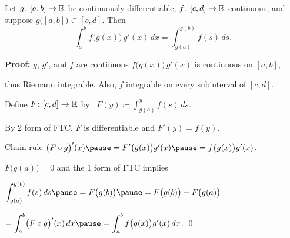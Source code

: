 \documentclass[10pt,aspectratio=149]{beamer}
\begin{document}
\begin{frame}

\begin{theorem}
Let $g \colon [a,b] \to {\mathbb{R}}$ be continuously differentiable,
\pause
$f \colon [c,d] \to {\mathbb{R}}$ continuous,
\pause
and suppose
$g\bigl([a,b]\bigr) \subset [c,d]$.
\pause
Then
\vspace*{-6pt}
\begin{equation*}
\int_a^b f\bigl(g(x)\bigr)\, g'(x)\, dx =
\int_{g(a)}^{g(b)} f(s)\, ds .
\end{equation*}
\end{theorem}

\pause
\textbf{Proof:}
$g$, $g'$, and $f$ are continuous
\pause
\wthus $f\bigl(g(x)\bigr)\,g'(x)$
is continuous on $[a,b]$,

\pause
thus Riemann integrable.
\pause
\quad
Also, $f$ integrable on every subinterval of $[c,d]$.

\pause
\medskip

Define $F \colon [c,d] \to {\mathbb{R}}$ by~
$F(y) \coloneqq \int_{g(a)}^{y} f(s)\,ds$.

\pause
By 2 form of FTC, $F$ is differentiable and $F'(y) = f(y)$.

\pause
Chain
rule \wthus
$\bigl( F \circ g \bigr)' (x)
\pause
=
F'\bigl(g(x)\bigr) g'(x)
\pause
=
f\bigl(g(x)\bigr) g'(x)$.

\pause
$F\bigl(g(a)\bigr) = 0$ and
the 1 form of FTC implies

\pause
\medskip

$\displaystyle
\int_{g(a)}^{g(b)} f(s)\,ds
\pause
= F\bigl(g(b)\bigr)
\pause
= F\bigl(g(b)\bigr)-F\bigl(g(a)\bigr)
$

\pause
\qquad
$\displaystyle
=
\int_a^b 
\bigl( F \circ g \bigr)' (x) \,dx
\pause
=
\int_a^b 
f\bigl(g(x)\bigr) g'(x)
\,dx$.
\qed
\end{frame}
\end{document}
